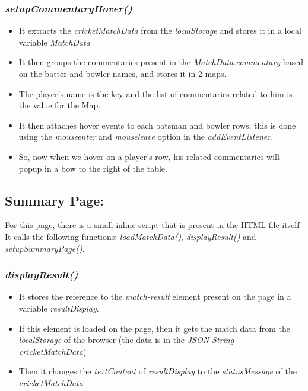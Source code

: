 \documentclass[a4paper,12pt]{article}
\begin{document}
\subsubsection{\textit{setupCommentaryHover()}}
\begin{itemize}
\item It extracts the \textit{cricketMatchData} from the \textit{localStorage} and stores it in a local variable \textit{MatchData}
\item It then groups the commentaries present in the \textit{MatchData.commentary} based on the batter and bowler names, and stores it in 2 maps.
\item The player's name is the key and the list of commentaries related to him is the value for the Map.
\item It then attaches hover events to each batsman and bowler rows, this is done using the \textit{mouseenter} and \textit{mouseleave} option in the \textit{addEventListener}.
\item So, now when we hover on a player's row, his related commentaries will popup in a bow to the right of the table.
\end{itemize}

\subsection{Summary Page:}
For this page, there is a small inline-script that is present in the HTML file itself \\
It calls the following functions: \textit{loadMatchData()}, \textit{displayResult()} and \\ \textit{setupSummaryPage()}.
\subsubsection{\textit{displayResult()}}
\begin{itemize}
\item It stores the reference to the \textit{match-result} element present on the page in a variable \textit{resultDisplay}.
\item If this element is loaded on the page, then it gets the match data from the \\ \textit{localStorage} of the browser (the data is in the \textit{JSON String cricketMatchData})
\item Then it changes the \textit{textContent} of \textit{resultDisplay} to the \textit{statusMessage} of the \\ \textit{cricketMatchData}
\end{itemize}
\end{document}
